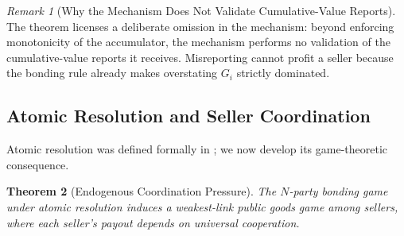 \documentclass[11pt,a4paper]{article}
\newtheorem{theorem}{Theorem}[section]
\theoremstyle{definition}
\theoremstyle{remark}
\newtheorem{remark}[theorem]{Remark}
\newcommand{\cumval}{G}        %
\begin{document}
\begin{remark}[Why the Mechanism Does Not Validate Cumulative-Value Reports]
The theorem licenses a deliberate omission in the mechanism: beyond
enforcing monotonicity of the accumulator, the mechanism performs no
validation of the cumulative-value reports it receives. Misreporting
cannot profit a seller because the bonding rule already makes
overstating $\cumval_i$ strictly dominated.
\end{remark}

\subsection{Atomic Resolution and Seller Coordination}
\label{sec:atomic-resolution}

Atomic resolution was defined formally in ;
we now develop its game-theoretic consequence.

\begin{theorem}[Endogenous Coordination Pressure]
\label{thm:coordination-pressure}
The $N$-party bonding game under atomic resolution induces a
\emph{weakest-link public goods game} among sellers, where each
seller's payout depends on universal cooperation.
\end{theorem}
\end{document}

